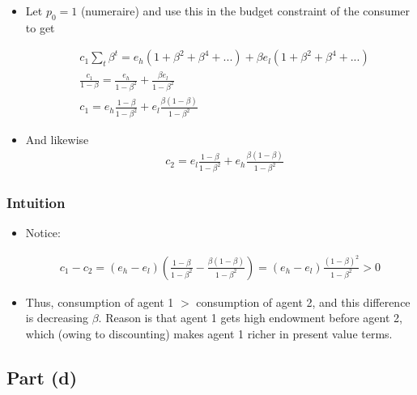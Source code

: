\documentclass{scrartcl}
\newcommand{\bit}{\begin{itemize}}
\newcommand{\eit}{\end{itemize}}
\begin{document}
\begin{itemize}
	\item Let $p_0=1$ (numeraire) and use this in the budget constraint of the consumer to get
	
	\begin{align}
	&c_1 \sum_t \beta^t= e_h (1+\beta^2+\beta^4+...)+ \beta e_l (1+\beta^2+\beta^4+...) \nonumber \\
	&\frac{c_1}{1-\beta}=\frac{e_h}{1-\beta^2}+\frac{\beta e_l}{1-\beta^2} \nonumber \\
	&c_{1}=e_h\frac{1-\beta}{1-\beta^2}+e_l\frac{\beta(1-\beta)}{1-\beta^2}
	\end{align}
	
	\item And likewise
	\begin{align}
	&c_{2}=e_l\frac{1-\beta}{1-\beta^2}+e_h\frac{\beta(1-\beta)}{1-\beta^2}
	\end{align}
	
	\end{itemize}

\subsubsection*{Intuition}

\bit

\item Notice:

\begin{align}
c_1-c_2=\left(e_h-e_l \right) \left( \frac{1-\beta}{1-\beta^2}-\frac{\beta(1-\beta)}{1-\beta^2} \right)=\left(e_h-e_l \right)\frac{(1-\beta)^2}{1-\beta^2}>0
\end{align}

\item Thus, consumption of agent 1 $>$ consumption of agent 2, and this difference is decreasing $\beta$. Reason is that agent 1 gets high endowment before agent 2, which (owing to discounting) makes agent 1 richer in present value terms. 

\eit


\subsection*{Part (d)}
\end{document}

